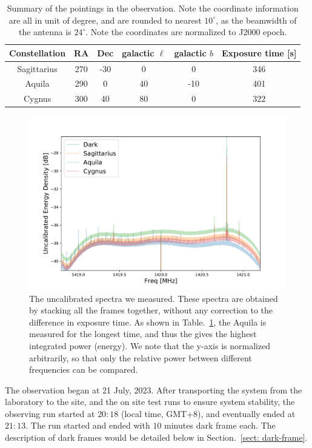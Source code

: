 \documentclass[12pt]{article}
\begin{document}
    \begin{table}
        \centering
        \begin{tabular}{c|c|c|c|c|c}
            Constellation & RA & Dec & galactic $\ell$ & galactic $b$ & Exposure time [s] \\
            \hline \hline
            Sagittarius & 270 & -30 & 0 & 0 & 346\\
            \hline
            Aquila  & 290 & 0 & 40& -10& 401\\
            \hline
             Cygnus & 300 & 40 & 80& 0& 322\\
             \hline
        \end{tabular}
        \caption{Summary of the pointings in the observation. Note the coordinate information are all in unit of degree, and are rounded to nearest $10^\circ$, as the beamwidth of the antenna is $24^\circ$. Note the coordinates are normalized to J$2000$ epoch. }
        \label{tab: pointing-specification}
    \end{table}

    \begin{figure}
	    \centering
	    \includegraphics[width=\textwidth]{plots/raw-stacked-spectra.pdf}
	    \caption{The uncalibrated spectra we measured. These spectra are obtained by stacking all the frames together, without any correction to the difference in exposure time. As shown in Table.~\ref{tab: pointing-specification}, the Aquila is measured for the longest time, and thus the gives the highest integrated power (energy). We note that the y-axis is normalized arbitrarily, so that only the relative power between different frequencies can be compared. }
	    \label{fig: raw-spectra}
	\end{figure}
    The observation began at 21 July, 2023. 
    After transporting the system from the laboratory to the site, and the on site test runs to ensure system stability,
    the observing run started at $20:18$ (local time, GMT+8), and eventually ended at $21:13$.
    The run started and ended with $10$ minutes dark frame each. 
    The description of dark frames would be detailed below in Section.~\ref{sect: dark-frame}.
\end{document}
